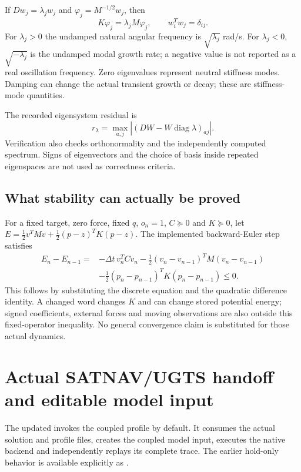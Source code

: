 If $Dw_j=\lambda_jw_j$ and $\varphi_j=M^{-1/2}w_j$, then
\begin{equation}
K\varphi_j=\lambda_j M\varphi_j,\qquad
w_i^Tw_j=\delta_{ij}.
\end{equation}
For $\lambda_j>0$ the undamped natural angular frequency is
$\sqrt{\lambda_j}$ rad/s. For $\lambda_j<0$, $\sqrt{-\lambda_j}$ is the
undamped modal growth rate; a negative value is not reported as a real oscillation
frequency. Zero eigenvalues represent neutral stiffness modes. Damping can change
the actual transient growth or decay; these are stiffness-mode quantities.

The recorded eigensystem residual is
\begin{equation}
r_\lambda=\max_{a,j}|(DW-W\operatorname{diag}\lambda)_{aj}|.
\end{equation}
Verification also checks orthonormality and the independently computed spectrum.
Signs of eigenvectors and the choice of basis inside repeated eigenspaces are not
used as correctness criteria.

\subsection{What stability can actually be proved}
For a fixed target, zero force, fixed $q$, $o_n=1$, $C\succeq0$ and $K\succeq0$,
let $E=\tfrac12v^TMv+\tfrac12(p-z)^TK(p-z)$. The implemented backward-Euler step
satisfies
\begin{align}
E_n-E_{n-1}={}&-\Delta t\,v_n^TCv_n
-\tfrac12(v_n-v_{n-1})^TM(v_n-v_{n-1})\nonumber\\
&-\tfrac12(p_n-p_{n-1})^TK(p_n-p_{n-1})\le0.
\end{align}
This follows by substituting the discrete equation and the quadratic difference
identity. A changed word changes $K$ and can change stored potential energy;
signed coefficients, external forces and moving observations are also outside
this fixed-operator inequality. No general convergence claim is substituted for
those actual dynamics.
\clearpage

\section{Actual SATNAV/UGTS handoff and editable model input}
The updated  invokes the coupled profile by default.
It consumes the actual solution and profile files, creates the coupled model input,
executes the native backend and independently replays its complete trace. The
earlier hold-only behavior is available explicitly as .

